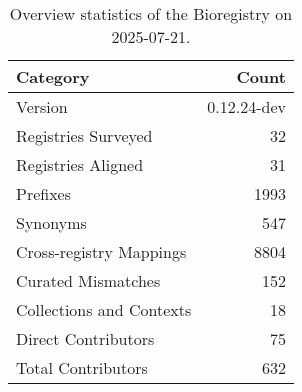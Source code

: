 \begin{table}
\caption{Overview statistics of the Bioregistry on 2025-07-21.}
\label{tab:bioregistry-summary}
\begin{tabular}{lr}
\toprule
Category & Count \\
\midrule
Version & 0.12.24-dev \\
Registries Surveyed & 32 \\
Registries Aligned & 31 \\
Prefixes & 1993 \\
Synonyms & 547 \\
Cross-registry Mappings & 8804 \\
Curated Mismatches & 152 \\
Collections and Contexts & 18 \\
Direct Contributors & 75 \\
Total Contributors & 632 \\
\bottomrule
\end{tabular}
\end{table}
